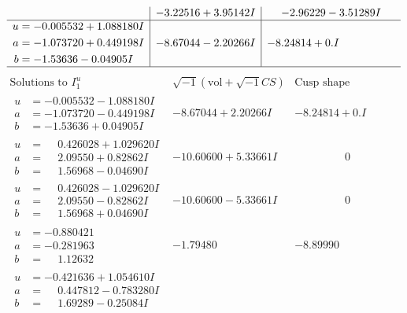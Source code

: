 \documentclass[1p]{elsarticle_modified}
\theoremstyle{definition}
\newcommand{\I}{\sqrt{-1}}
\begin{document}
$$\begin{array}{c|c|c}
 & -3.22516 + 3.95142 I & -2.96229 - 3.51289 I \\ \hline\begin{aligned}
u &= -0.005532 + 1.088180 I \\
a &= -1.073720 + 0.449198 I \\
b &= -1.53636 - 0.04905 I\end{aligned}
 & -8.67044 - 2.20266 I & -8.24814 + 0. I\phantom{ +0.000000I}\\
 \hline 
 \end{array}$$\newpage$$\begin{array}{c|c|c}  
\text{Solutions to }I^u_{1}& \I (\text{vol} + \sqrt{-1}CS) & \text{Cusp shape}\\
 \hline 
\begin{aligned}
u &= -0.005532 - 1.088180 I \\
a &= -1.073720 - 0.449198 I \\
b &= -1.53636 + 0.04905 I\end{aligned}
 & -8.67044 + 2.20266 I & -8.24814 + 0. I\phantom{ +0.000000I} \\ \hline\begin{aligned}
u &= \phantom{-}0.426028 + 1.029620 I \\
a &= \phantom{-}2.09550 + 0.82862 I \\
b &= \phantom{-}1.56968 - 0.04690 I\end{aligned}
 & -10.60600 + 5.33661 I & \phantom{-0.000000 } 0 \\ \hline\begin{aligned}
u &= \phantom{-}0.426028 - 1.029620 I \\
a &= \phantom{-}2.09550 - 0.82862 I \\
b &= \phantom{-}1.56968 + 0.04690 I\end{aligned}
 & -10.60600 - 5.33661 I & \phantom{-0.000000 } 0 \\ \hline\begin{aligned}
u &= -0.880421\phantom{ +0.000000I} \\
a &= -0.281963\phantom{ +0.000000I} \\
b &= \phantom{-}1.12632\phantom{ +0.000000I}\end{aligned}
 & -1.79480\phantom{ +0.000000I} & -8.89990\phantom{ +0.000000I} \\ \hline\begin{aligned}
u &= -0.421636 + 1.054610 I \\
a &= \phantom{-}0.447812 - 0.783280 I \\
b &= \phantom{-}1.69289 - 0.25084 I\end{aligned}

\end{array}$$
\end{document}
